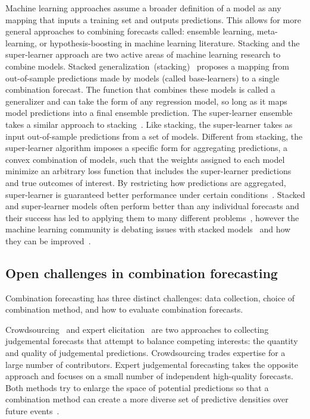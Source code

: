 \documentclass[preprint,authoryear]{elsarticle}
\begin{document}
Machine learning approaches assume a broader definition of a model as any mapping that inputs a training set and outputs predictions.
This allows for more general approaches to combining forecasts called: ensemble learning, meta-learning, or hypothesis-boosting in machine learning literature.
Stacking and the super-learner approach are two active areas of machine learning research to combine models.
%
Stacked generalization~(stacking)~\citep{wolpert1992stacked} proposes a mapping from out-of-sample predictions made by models (called base-learners) to a single combination forecast.
The function that combines these models is called a generalizer and can take the form of any regression model, so long as it maps model predictions into a final ensemble prediction.
The super-learner ensemble takes a similar approach to stacking~\citep{van2007super,polley2010super}. 
Like stacking, the super-learner takes as input out-of-sample predictions from a set of models.
Different from stacking, the super-learner algorithm imposes a specific form for aggregating predictions, a convex combination of models, such that the weights assigned to each model minimize an arbitrary loss function that includes the super-learner predictions and true outcomes of interest.
By restricting how predictions are aggregated, super-learner is guaranteed better performance under certain conditions~\citep{van2007super,polley2010super}. 
%
Stacked and super-learner models often perform better than any individual forecasts and their success has led to applying them to many different problems~\citep{syarif2012application,sakkis2001stacking,che2011decision,wang2011comparative}, however the machine learning community is debating issues with stacked models~\cite{ting1999issues} and how they can be improved~\cite{dvzeroski2004combining}. 

\subsection{Open challenges in combination forecasting}
Combination forecasting has three distinct challenges: data collection, choice of combination method, and how to evaluate combination forecasts.

Crowdsourcing~\citep{howe2006rise,brabham2013crowdsourcing,abernethy2011collaborative,forlines2014crowdsourcing,moran2016epidemic} and expert elicitation~\cite{amara1971some,yousuf2007using,o2006uncertain} are two approaches to collecting judgemental forecasts that attempt to balance competing interests: the quantity and quality of judgemental predictions.
Crowdsourcing trades expertise for a large number of contributors.
Expert judgemental forecasting takes the opposite approach and focuses on a small number of independent high-quality forecasts. 
Both methods try to enlarge the space of potential predictions so that a combination method can create a more diverse set of predictive densities over future events~\citep{dietterich2002ensemble,bates1969combination}.
\end{document}

